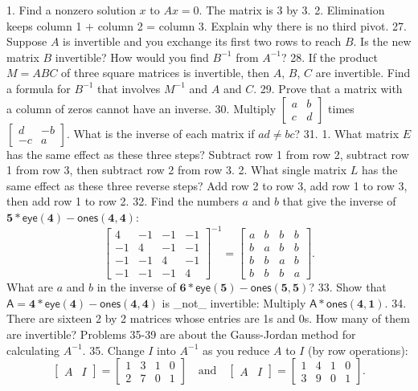 1. Find a nonzero solution \(x\) to \(Ax=0\). The matrix is 3 by 3. 2. Elimination keeps column 1 \(+\) column 2 = column 3. Explain why there is no third pivot.
27. Suppose \(A\) is invertible and you exchange its first two rows to reach \(B\). Is the new matrix \(B\) invertible? How would you find \(B^{-1}\) from \(A^{-1}\)?
28. If the product \(M=ABC\) of three square matrices is invertible, then \(A\), \(B\), \(C\) are invertible. Find a formula for \(B^{-1}\) that involves \(M^{-1}\) and \(A\) and \(C\).
29. Prove that a matrix with a column of zeros cannot have an inverse.
30. Multiply \([\begin{smallmatrix}a&b\\ c&d\end{smallmatrix}]\) times \([\begin{smallmatrix}d&-b\\ -c&a\end{smallmatrix}]\). What is the inverse of each matrix if \(ad\neq bc\)?
31. 1. What matrix \(E\) has the same effect as these three steps? Subtract row 1 from row 2, subtract row 1 from row 3, then subtract row 2 from row 3. 2. What single matrix \(L\) has the same effect as these three reverse steps? Add row 2 to row 3, add row 1 to row 3, then add row 1 to row 2.
32. Find the numbers \(a\) and \(b\) that give the inverse of \(\mathbf{5}*\mathsf{eye}(\mathbf{4})-\mathsf{ones}(\mathbf{4},\mathbf{4})\): \[\begin{bmatrix}4&-1&-1&-1\\ -1&4&-1&-1\\ -1&-1&4&-1\\ -1&-1&-1&4\end{bmatrix}^{-1}=\begin{bmatrix}a&b&b&b\\ b&a&b&b\\ b&b&a&b\\ b&b&b&a\end{bmatrix}.\] What are \(a\) and \(b\) in the inverse of \(\mathbf{6}*\mathsf{eye}(\mathbf{5})-\mathsf{ones}(\mathbf{5},\mathbf{5})\)?
33. Show that \(\mathsf{A}=\mathbf{4}*\mathsf{eye}(\mathbf{4})-\mathsf{ones}(\mathbf{4}, \mathbf{4})\) is _not_ invertible: Multiply \(\mathsf{A}*\mathsf{ones}(\mathbf{4},\mathbf{1})\).
34. There are sixteen 2 by 2 matrices whose entries are 1s and 0s. How many of them are invertible? Problems 35-39 are about the Gauss-Jordan method for calculating \(A^{-1}\).
35. Change \(I\) into \(A^{-1}\) as you reduce \(A\) to \(I\) (by row operations): \[\begin{bmatrix}A&I\end{bmatrix}=\begin{bmatrix}1&3&1&0\\ 2&7&0&1\end{bmatrix}\quad\text{and}\quad\begin{bmatrix}A&I\end{bmatrix}= \begin{bmatrix}1&4&1&0\\ 3&9&0&1\end{bmatrix}.\]
